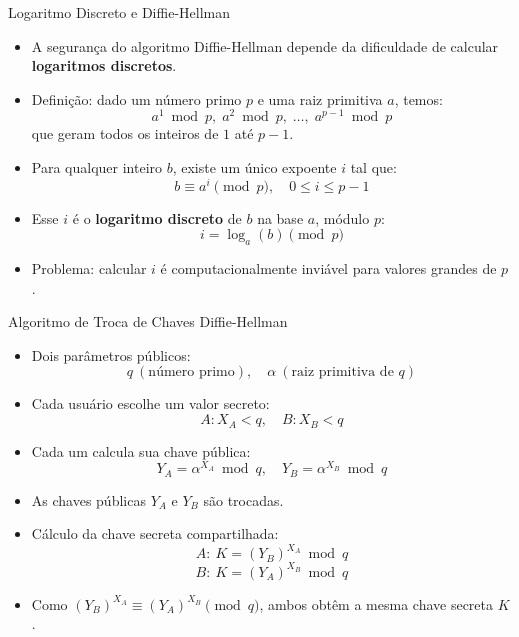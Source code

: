 \begin{frame}{Logaritmo Discreto e Diffie-Hellman}
  \begin{itemize}
    \item A segurança do algoritmo Diffie-Hellman depende da dificuldade de calcular \textbf{logaritmos discretos}.
    \item Definição: dado um número primo $p$ e uma raiz primitiva $a$, temos:
          \[
            a^1 \bmod p, \; a^2 \bmod p, \; \ldots, \; a^{p-1} \bmod p
          \]
          que geram todos os inteiros de $1$ até $p-1$.
    \item Para qualquer inteiro $b$, existe um único expoente $i$ tal que:
          \[
            b \equiv a^i \pmod{p}, \quad 0 \leq i \leq p-1
          \]
    \item Esse $i$ é o \textbf{logaritmo discreto} de $b$ na base $a$, módulo $p$:
          \[
            i = \log_a (b) \pmod{p}
          \]
    \item Problema: calcular $i$ é computacionalmente inviável para valores grandes de $p$.
  \end{itemize}
\end{frame}
\begin{frame}{Algoritmo de Troca de Chaves Diffie-Hellman}
  \begin{itemize}
    \item Dois parâmetros públicos:
          \[
            q \ (\text{número primo}), \quad \alpha \ (\text{raiz primitiva de } q)
          \]
    \item Cada usuário escolhe um valor secreto:
          \[
            A: X_A < q, \quad B: X_B < q
          \]
    \item Cada um calcula sua chave pública:
          \[
            Y_A = \alpha^{X_A} \bmod q, \quad Y_B = \alpha^{X_B} \bmod q
          \]
    \item As chaves públicas $Y_A$ e $Y_B$ são trocadas.
    \item Cálculo da chave secreta compartilhada:
          \[
            A: \ K = (Y_B)^{X_A} \bmod q
          \]
          \[
            B: \ K = (Y_A)^{X_B} \bmod q
          \]
    \item Como $(Y_B)^{X_A} \equiv (Y_A)^{X_B} \pmod{q}$, ambos obtêm a mesma chave secreta $K$.
  \end{itemize}
\end{frame}

